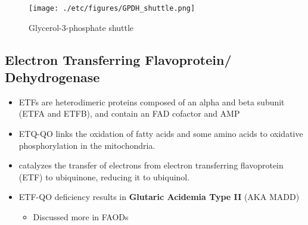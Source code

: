 \documentclass{scrartcl}
\begin{document}
\begin{figure}[htbp]
\centering
\texttt{[image: ./etc/figures/GPDH\_shuttle.png]}
\caption[g3ps]{\label{fig:org8c251d3}
Glycerol-3-phosphate shuttle}
\end{figure}

\subsection{Electron Transferring Flavoprotein/ Dehydrogenase}
\label{sec:orgffde1a8}

\begin{itemize}
\item ETFs are heterodimeric proteins composed of an alpha and beta
subunit (ETFA and ETFB), and contain an FAD cofactor and AMP

\item ETQ-QO links the oxidation of fatty acids and some amino acids to
oxidative phosphorylation in the mitochondria.
\item catalyzes the transfer of electrons from electron transferring
flavoprotein (ETF) to ubiquinone, reducing it to ubiquinol.
\end{itemize}

{\small{}}

\begin{itemize}
\item ETF-QO deficiency results in \textbf{Glutaric Acidemia Type II} (AKA MADD)
\begin{itemize}
\item Discussed more in FAODs
\end{itemize}
\end{itemize}
\end{document}
